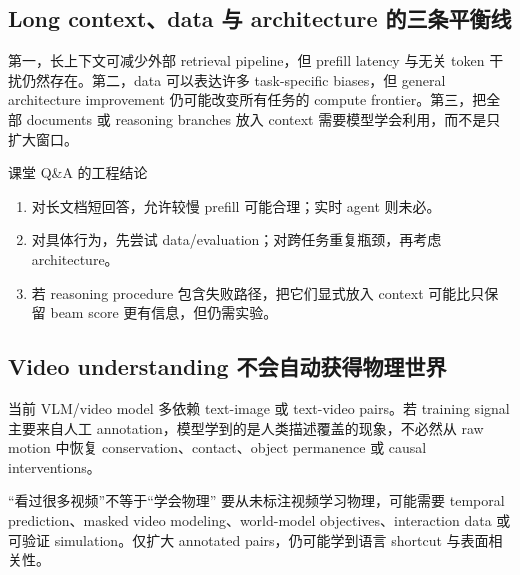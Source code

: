 \documentclass[a4paper]{article}
\begin{document}
\subsection{Long context、data 与 architecture 的三条平衡线}

第一，长上下文可减少外部 retrieval pipeline，但 prefill latency 与无关 token 干扰仍然存在。第二，data 可以表达许多 task-specific biases，但 general architecture improvement 仍可能改变所有任务的 compute frontier。第三，把全部 documents 或 reasoning branches 放入 context 需要模型学会利用，而不是只扩大窗口。

\begin{importantbox}{课堂 Q\&A 的工程结论}
\begin{enumerate}
  \item 对长文档短回答，允许较慢 prefill 可能合理；实时 agent 则未必。
  \item 对具体行为，先尝试 data/evaluation；对跨任务重复瓶颈，再考虑 architecture。
  \item 若 reasoning procedure 包含失败路径，把它们显式放入 context 可能比只保留 beam score 更有信息，但仍需实验。
\end{enumerate}
\end{importantbox}


\subsection{Video understanding 不会自动获得物理世界}

当前 VLM/video model 多依赖 text-image 或 text-video pairs。若 training signal 主要来自人工 annotation，模型学到的是人类描述覆盖的现象，不必然从 raw motion 中恢复 conservation、contact、object permanence 或 causal interventions。

\begin{warningbox}{“看过很多视频”不等于“学会物理”}
要从未标注视频学习物理，可能需要 temporal prediction、masked video modeling、world-model objectives、interaction data 或可验证 simulation。仅扩大 annotated pairs，仍可能学到语言 shortcut 与表面相关性。
\end{warningbox}

\end{document}
